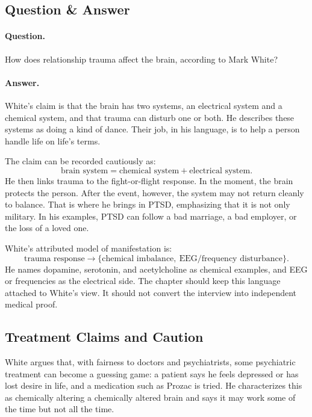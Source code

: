 \subsection{Question \& Answer}

\paragraph{Question.} How does relationship trauma affect the brain, according to Mark White?

\paragraph{Answer.} White's claim is that the brain has two systems, an electrical system and a chemical system, and that trauma can disturb one or both. He describes these systems as doing a kind of dance. Their job, in his language, is to help a person handle life on life's terms.

The claim can be recorded cautiously as:
\begin{equation}
\text{brain system}
=
\text{chemical system}
+
\text{electrical system}.
\end{equation}
He then links trauma to the fight-or-flight response. In the moment, the brain protects the person. After the event, however, the system may not return cleanly to balance. That is where he brings in PTSD, emphasizing that it is not only military. In his examples, PTSD can follow a bad marriage, a bad employer, or the loss of a loved one.

White's attributed model of manifestation is:
\begin{equation}
\text{trauma response}
\longrightarrow
\{\text{chemical imbalance},\ \text{EEG/frequency disturbance}\}.
\end{equation}
He names dopamine, serotonin, and acetylcholine as chemical examples, and EEG or frequencies as the electrical side. The chapter should keep this language attached to White's view. It should not convert the interview into independent medical proof.

\subsection{Treatment Claims and Caution}

White argues that, with fairness to doctors and psychiatrists, some psychiatric treatment can become a guessing game: a patient says he feels depressed or has lost desire in life, and a medication such as Prozac is tried. He characterizes this as chemically altering a chemically altered brain and says it may work some of the time but not all the time.

